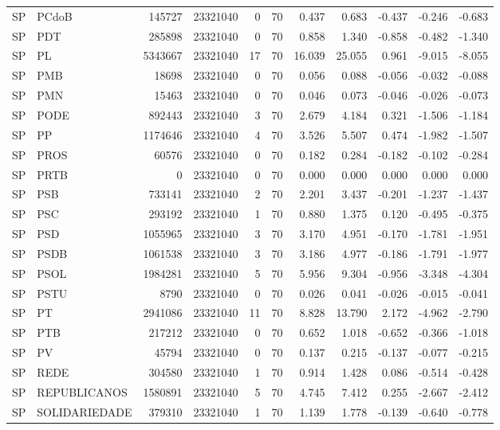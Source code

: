 \begin{landscape}
\begin{longtable}{llrrrrrrrrr}
SP & PCdoB & 145727 & 23321040 & 0 & 70 & 0.437 & 0.683 & -0.437 & -0.246 & -0.683 \\
SP & PDT & 285898 & 23321040 & 0 & 70 & 0.858 & 1.340 & -0.858 & -0.482 & -1.340 \\
SP & PL & 5343667 & 23321040 & 17 & 70 & 16.039 & 25.055 & 0.961 & -9.015 & -8.055 \\
SP & PMB & 18698 & 23321040 & 0 & 70 & 0.056 & 0.088 & -0.056 & -0.032 & -0.088 \\
SP & PMN & 15463 & 23321040 & 0 & 70 & 0.046 & 0.073 & -0.046 & -0.026 & -0.073 \\
SP & PODE & 892443 & 23321040 & 3 & 70 & 2.679 & 4.184 & 0.321 & -1.506 & -1.184 \\
SP & PP & 1174646 & 23321040 & 4 & 70 & 3.526 & 5.507 & 0.474 & -1.982 & -1.507 \\
SP & PROS & 60576 & 23321040 & 0 & 70 & 0.182 & 0.284 & -0.182 & -0.102 & -0.284 \\
SP & PRTB & 0 & 23321040 & 0 & 70 & 0.000 & 0.000 & 0.000 & 0.000 & 0.000 \\
SP & PSB & 733141 & 23321040 & 2 & 70 & 2.201 & 3.437 & -0.201 & -1.237 & -1.437 \\
SP & PSC & 293192 & 23321040 & 1 & 70 & 0.880 & 1.375 & 0.120 & -0.495 & -0.375 \\
SP & PSD & 1055965 & 23321040 & 3 & 70 & 3.170 & 4.951 & -0.170 & -1.781 & -1.951 \\
SP & PSDB & 1061538 & 23321040 & 3 & 70 & 3.186 & 4.977 & -0.186 & -1.791 & -1.977 \\
SP & PSOL & 1984281 & 23321040 & 5 & 70 & 5.956 & 9.304 & -0.956 & -3.348 & -4.304 \\
SP & PSTU & 8790 & 23321040 & 0 & 70 & 0.026 & 0.041 & -0.026 & -0.015 & -0.041 \\
SP & PT & 2941086 & 23321040 & 11 & 70 & 8.828 & 13.790 & 2.172 & -4.962 & -2.790 \\
SP & PTB & 217212 & 23321040 & 0 & 70 & 0.652 & 1.018 & -0.652 & -0.366 & -1.018 \\
SP & PV & 45794 & 23321040 & 0 & 70 & 0.137 & 0.215 & -0.137 & -0.077 & -0.215 \\
SP & REDE & 304580 & 23321040 & 1 & 70 & 0.914 & 1.428 & 0.086 & -0.514 & -0.428 \\
SP & REPUBLICANOS & 1580891 & 23321040 & 5 & 70 & 4.745 & 7.412 & 0.255 & -2.667 & -2.412 \\
SP & SOLIDARIEDADE & 379310 & 23321040 & 1 & 70 & 1.139 & 1.778 & -0.139 & -0.640 & -0.778 \\

\end{longtable}
\end{landscape}
